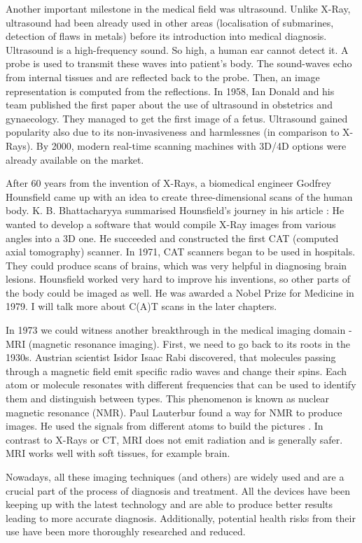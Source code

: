  Another important milestone in the medical field was ultrasound. Unlike X-Ray, ultrasound had been already used in other areas (localisation of submarines, detection of flaws in metals) before its introduction into medical diagnosis. Ultrasound is a high-frequency sound. So high, a human ear cannot detect it. A probe is used to transmit these waves into patient's body. The sound-waves echo from internal tissues and are reflected back to the probe. Then, an image representation is computed from the reflections. In 1958, Ian Donald and his team published the first paper about the use of ultrasound in obstetrics and gynaecology. They managed to get the first image of a fetus. Ultrasound gained popularity also due to its non-invasiveness and harmlessnes (in comparison to X-Rays). By 2000, modern real-time scanning machines with 3D/4D options were already available on the market.
 
 After 60 years from the invention of X-Rays, a biomedical engineer Godfrey Hounsfield came up with an idea to create three-dimensional scans of the human body. K. B. Bhattacharyya summarised Hounsfield's journey in his article \cite{bhattacharyya2016}: He wanted to develop a software that would compile X-Ray images from various angles into a 3D one. He succeeded and constructed the first CAT (computed axial tomography) scanner. In 1971, CAT scanners began to be used in hospitals. They could produce scans of brains, which was very helpful in diagnosing brain lesions. Hounsfield worked very hard to improve his inventions, so other parts of the body could be imaged as well. He was awarded a Nobel Prize for Medicine in 1979. I will talk more about C(A)T scans in the later chapters.
 
In 1973 we could witness another breakthrough in the medical imaging domain - MRI (magnetic resonance imaging). First, we need to go back to its roots in the 1930s. Austrian scientist Isidor Isaac Rabi discovered, that molecules passing through a magnetic field emit specific radio waves and change their spins. Each atom or molecule resonates with different frequencies that can be used to identify them and distinguish between types. This phenomenon is known as nuclear magnetic resonance (NMR). Paul Lauterbur found a way for NMR to produce images. He used the signals from different atoms to build the pictures \cite{lauterbur1973}. In contrast to X-Rays or CT, MRI does not emit radiation and is generally safer. MRI works well with soft tissues, for example brain.

Nowadays, all these imaging techniques (and others) are widely used and are a crucial part of the process of diagnosis and treatment. All the devices have been keeping up with the latest technology and are able to produce better results leading to more accurate diagnosis. Additionally, potential health risks from their use have been more thoroughly researched and reduced.

